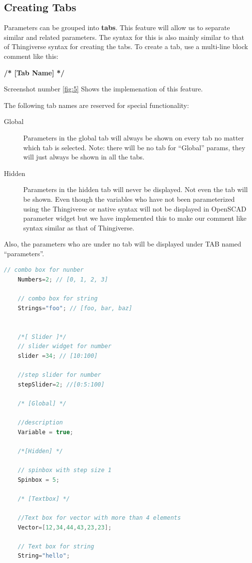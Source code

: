 \subsection{Creating Tabs}
Parameters can be grouped into \textbf{tabs}. This feature will allow us to separate similar and related parameters. The syntax for this is also mainly similar to that of Thingiverse syntax for creating the tabs. To create a tab, use a multi-line block comment like this:

\textbf{/* [Tab Name] */}


Screenshot number \ref{fig:5} Shows the implemenation of this feature.

The following tab names are reserved for special functionality:
\begin{description}
\item [Global] Parameters in the global tab will always be shown on every tab no matter which tab is selected. Note: there will be no tab for “Global” params, they will just always be shown in all the tabs.

\item [Hidden] Parameters in the hidden tab will never be displayed. Not even the tab will be shown. Even though the variables who have not been parameterized using the Thingiverse or native syntax will not be displayed in OpenSCAD parameter widget but we have implemented this to make our comment like syntax similar as that of Thingiverse.
\end{description}

Also, the parameters who are under no tab will be displayed under TAB named “parameters”.
\begin{lstlisting}[language=c++]
    // combo box for nunber
    Numbers=2; // [0, 1, 2, 3]
   
    // combo box for string
    Strings="foo"; // [foo, bar, baz]
   
   
    /*[ Slider ]*/
    // slider widget for number
    slider =34; // [10:100]
   
    //step slider for number
    stepSlider=2; //[0:5:100]
   
    /* [Global] */
   
    //description
    Variable = true;
   
    /*[Hidden] */
   
    // spinbox with step size 1
    Spinbox = 5;
   
    /* [Textbox] */
   
    //Text box for vector with more than 4 elements
    Vector=[12,34,44,43,23,23];
   
    // Text box for string
    String="hello";
   
\end{lstlisting}

